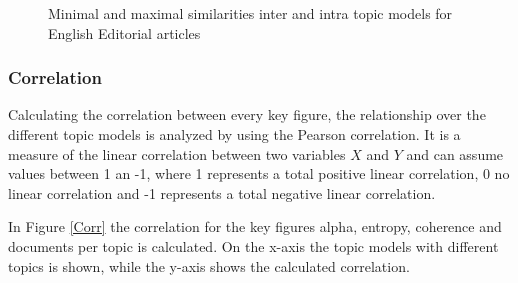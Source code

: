 \begin{figure}
	\begin{minipage}[t]{0.5\textwidth}
	\end{minipage}
	\begin{minipage}[t]{0.5\textwidth}
	\end{minipage}
	\caption{Minimal and maximal similarities inter and intra topic models for English Editorial articles}
	\label{min_max_sim_eng}
\end{figure}



\subsubsection{Correlation}
Calculating the correlation between every key figure, the relationship over the different topic models is analyzed by using the Pearson correlation. It is a measure of the linear correlation between two variables $X$ and $Y$ and can assume values between 1 an -1, where 1 represents a total positive linear correlation, 0 no linear correlation and -1 represents a total negative linear correlation. 

In Figure \ref{Corr} the correlation for the key figures alpha, entropy, coherence and documents per topic is calculated. 
On the x-axis the topic models with different topics is shown, while the y-axis shows the calculated correlation.

